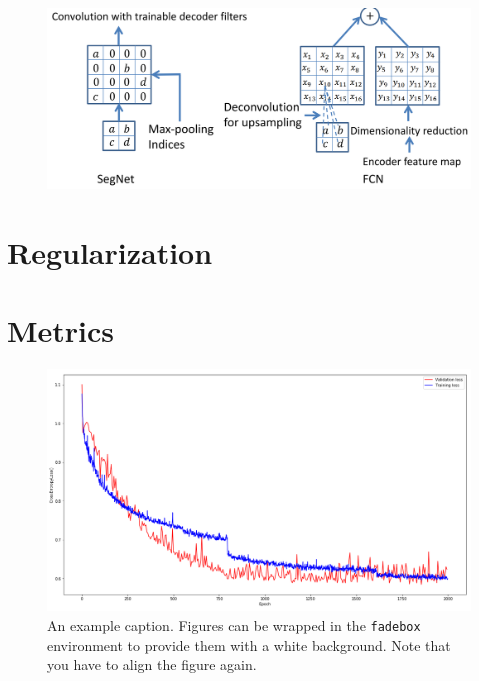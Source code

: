 \documentclass[
]{dtuposter}
\begin{document}
\begin{dtupostercontent}
\begin{figure}
	\centering
	\includegraphics[width=1\linewidth]{MaxPool}
	\caption{}
	\label{fig:maxpool}
\end{figure}


\section{Regularization }


\section{Metrics}


\begin{figure}
	\begin{fadebox}\begin{center}
			\includegraphics[width=\linewidth,origin=c]{loss}
	\end{center}\end{fadebox}
	\caption{An example caption. Figures can be wrapped in the \texttt{fadebox} 
		environment to provide them with a white background. Note that you have to align the 
		figure again.}\label{fig:example2}
\end{figure}


\end{dtupostercontent}
\end{document}
